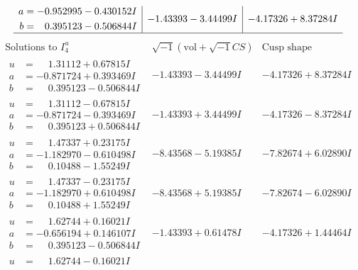 \documentclass[1p]{elsarticle_modified}
\theoremstyle{definition}
\newcommand{\I}{\sqrt{-1}}
\begin{document}
$$\begin{array}{c|c|c}
\begin{aligned}
a &= -0.952995 - 0.430152 I \\
b &= \phantom{-}0.395123 - 0.506844 I\end{aligned}
 & -1.43393 - 3.44499 I & -4.17326 + 8.37284 I\\
 \hline 
 \end{array}$$\newpage$$\begin{array}{c|c|c}  
\text{Solutions to }I^u_{4}& \I (\text{vol} + \sqrt{-1}CS) & \text{Cusp shape}\\
 \hline 
\begin{aligned}
u &= \phantom{-}1.31112 + 0.67815 I \\
a &= -0.871724 + 0.393469 I \\
b &= \phantom{-}0.395123 - 0.506844 I\end{aligned}
 & -1.43393 - 3.44499 I & -4.17326 + 8.37284 I \\ \hline\begin{aligned}
u &= \phantom{-}1.31112 - 0.67815 I \\
a &= -0.871724 - 0.393469 I \\
b &= \phantom{-}0.395123 + 0.506844 I\end{aligned}
 & -1.43393 + 3.44499 I & -4.17326 - 8.37284 I \\ \hline\begin{aligned}
u &= \phantom{-}1.47337 + 0.23175 I \\
a &= -1.182970 - 0.610498 I \\
b &= \phantom{-}0.10488 - 1.55249 I\end{aligned}
 & -8.43568 - 5.19385 I & -7.82674 + 6.02890 I \\ \hline\begin{aligned}
u &= \phantom{-}1.47337 - 0.23175 I \\
a &= -1.182970 + 0.610498 I \\
b &= \phantom{-}0.10488 + 1.55249 I\end{aligned}
 & -8.43568 + 5.19385 I & -7.82674 - 6.02890 I \\ \hline\begin{aligned}
u &= \phantom{-}1.62744 + 0.16021 I \\
a &= -0.656194 + 0.146107 I \\
b &= \phantom{-}0.395123 - 0.506844 I\end{aligned}
 & -1.43393 + 0.61478 I & -4.17326 + 1.44464 I \\ \hline\begin{aligned}
u &= \phantom{-}1.62744 - 0.16021 I \\

\end{aligned}
\end{array}$$
\end{document}
